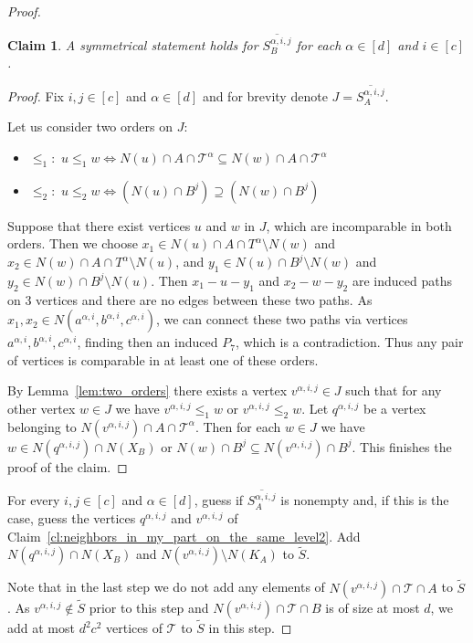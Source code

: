 \documentclass[11pt,a4paper]{article}
\newtheorem{claim}[theorem]{Claim}
\theoremstyle{definition}
\def\T{\mathcal{T}}
\begin{document}
\begin{proof}
\begin{claim}
A symmetrical statement holds for $\overline{S_B^{\alpha,i,j}}$ for each $\alpha\in[d]$ and $i\in[c]$. 
\end{claim}
\begin{proof}
    Fix $i,j \in [c]$ and $\alpha \in [d]$ and for brevity denote
    $J = \overline{S_A^{\alpha,i,j}}$. 

    Let us consider two orders on $J$:
    \begin{itemize}
        \item $\leq_1:$ $u\leq_1 w \Leftrightarrow N(u)\cap A\cap \T^\alpha \subseteq N(w)\cap A\cap \T^\alpha$
        \item $\leq_2:$ $u\leq_2 w \Leftrightarrow (N(u)\cap B^j) \supseteq (N(w)\cap B^j)$
    \end{itemize}
    Suppose that there exist vertices $u$ and $w$ in $J$, which are incomparable in both orders. Then we choose $x_1\in N(u)\cap A\cap T^\alpha\setminus N(w)$ and $x_2\in N(w)\cap A\cap T^\alpha\setminus N(u)$, and $y_1 \in N(u)\cap B^j \setminus N(w)$ and $y_2\in N(w)\cap B^j\setminus N(u)$. 
    Then $x_1-u-y_1$ and $x_2-w-y_2$ are induced paths on 3 vertices and there are no edges between these two paths. As $x_1,x_2\in N(a^{\alpha, i}, b^{\alpha, i}, c^{\alpha,i})$, we can connect these two paths via vertices $a^{\alpha, i}, b^{\alpha, i}, c^{\alpha,i}$, finding then an induced $P_7$, which is a contradiction. Thus any pair of vertices is comparable in at least one of these orders. 

    By Lemma~\ref{lem:two_orders} there exists a vertex $v^{\alpha,i, j} \in J$ such that for any other vertex $w\in J$ we have $v^{\alpha,i, j} \leq_1 w$ or $v^{\alpha, i,j}\leq_2 w$. Let $q^{\alpha, i, j}$ be a vertex belonging to $N(v^{\alpha, i,j})\cap A\cap \T^\alpha$. 
    Then for each $w\in J$ we have $w\in N(q^{\alpha, i,j})\cap N(X_B)$ or $N(w)\cap B^j\subseteq N(v^{\alpha,i,j})\cap B^j$.
    This finishes the proof of the claim. 
\end{proof}
For every $i,j \in [c]$ and $\alpha \in [d]$, guess if $\overline{S_A^{\alpha,i,j}}$
is nonempty and, if this is the case, guess the vertices $q^{\alpha,i,j}$ 
and $v^{\alpha,i,j}$ of Claim~\ref{cl:neighbors_in_my_part_on_the_same_level2}. 
Add $N(q^{\alpha,i,j}) \cap N(X_B)$ 
and $N(v^{\alpha,i,j}) \setminus N(K_A)$ to $\widetilde{S}$.

Note that in the last step we do not add any elements of $N(v^{\alpha,i,j}) \cap \T \cap A$
to $\widetilde{S}$.
As $v^{\alpha,i,j} \notin \widetilde{S}$ prior to this step and
$N(v^{\alpha,i,j}) \cap \T \cap B$ is of size at most $d$, we add at most $d^2 c^2$ vertices of $\T$ to $\widetilde{S}$ in this step.


\end{proof}
\end{document}

